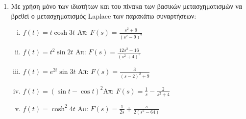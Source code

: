


\usepackage[RPvoltages]{circuitikz}
\everymath{\displaystyle}


\geometry{left=15.63mm,right=15.63mm,top=30.25mm,bottom=33.25mm,
footskip=24.16mm,headsep=24.16mm}

\pagestyle{vangelis}





\begin{center}
  \minibox{\large\bfseries \textcolor{Col1}{Μηχανικές και Ηλεκτρικές ταλαντώσεις}}
\end{center}

\vspace{\baselineskip}

\begin{enumerate}

  \item Με χρήση μόνο των ιδιοτήτων και του πίνακα των βασικών μετασχηματισμών να 
    βρεθεί ο μετασχηματισμός Laplace των παρακάτω συναρτήσεων:
    \begin{enumerate}[i)]
      \item $ f(t) = t \cosh{3t} $ \hfill Απ: $ F(s) = \frac{s^{2}+9}{(s^{2}-9)^{2}} $ 
      \item $ f(t) = t^{2} \sin{2t} $ \hfill Απ: $F(s)=\frac{12s^{2}-16}{(s^{2}+4)^{3}}$
      \item $f(t)=e^{2t}\sin 3t$ \hfill Απ: $F(s)=\frac{3}{(s-2)^2+9}$
      \item $f(t)=(\sin t-\cos t)^2$\hfill Απ: $F(s)=\frac{1}{s}-\frac{2}{s^2+4}$
      \item $f(t)=\cosh^2 4t$ \hfill Απ: $F(s)=\frac{1}{2s}+\frac{s}{2(s^2-64)}$
    \end{enumerate}


\end{enumerate}
